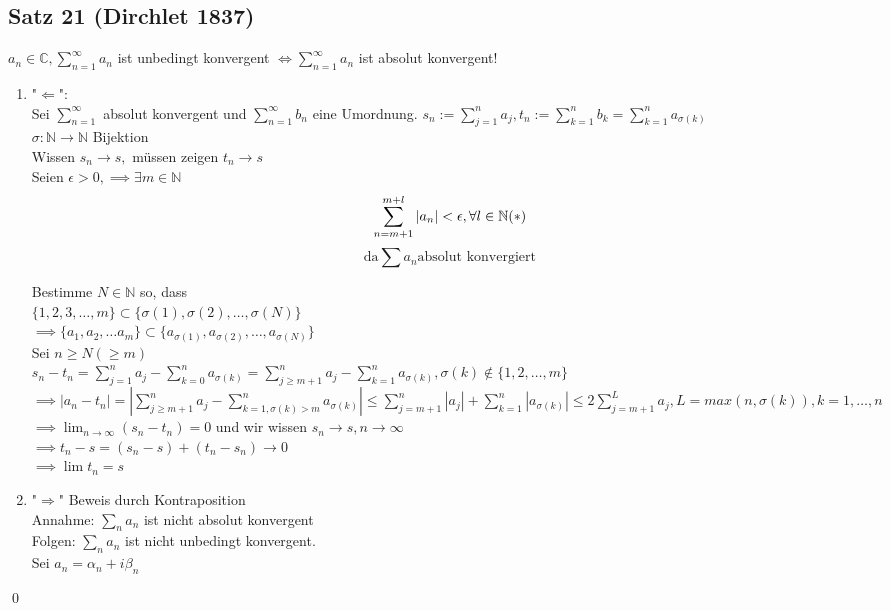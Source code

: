 \documentclass[fleqn]{scrbook}
\newcommand{\N}{\mathbb{N}}
\newcommand{\sumOI}{\sum_{n=1}^{\infty}}
\renewenvironment{proof}{{\bfseries Beweis }}{\qed}
\begin{document}
\subsection{Satz 21 (Dirchlet 1837)}
$a_n \in\mathbb{C}, \sumOI a_n$ ist unbedingt konvergent $\Leftrightarrow \sumOI a_n$ ist absolut konvergent!\\
\begin{proof}
\begin{enumerate}[1)]
  \item "$\Leftarrow$": \\
  Sei $\sumOI$ absolut konvergent und $\sumOI b_n$ eine Umordnung.
  $s_n := \sum_{j=1}^n a_j, t_n := \sum_{k=1}^n b_k = \sum_{k=1}^n a_{\sigma (k)}$\\
  $\sigma : \mathbb{N} \rightarrow \mathbb{N}$ Bijektion\\
  Wissen $s_n \rightarrow s,$ müssen zeigen $t_n \rightarrow s$\\
  Seien $\epsilon > 0, \implies \exists m \in \N$
  $$\sum_{n=m+1}^{m+l} |a_n| < \epsilon, \forall l \in\mathbb{N}\text{(\textasteriskcentered )}$$
  $$\text{da} \sum a_n \text{absolut konvergiert}$$

  Bestimme $N \in \mathbb{N}$ so, dass\\
  $\{ 1,2,3,\ldots,m\} \subset \{ \sigma (1), \sigma (2), \ldots, \sigma (N)\}$\\
  $\implies \{a_1, a_2, \ldots a_m\} \subset \{a_{\sigma (1)}, a_{\sigma(2)}, \ldots , a_{\sigma (N)}\}$\\
  Sei $n\geq N (\geq m)$\\
  $s_n - t_n = \sum_{j=1}^n a_j - \sum_{k=0}^n a_{\sigma (k)} = \sum_{j \geq m + 1}^n a_j - \sum_{k=1}^n a_{\sigma (k)}, \sigma (k) \notin \{1,2,\ldots ,m\}$\\
  $\implies |a_n - t_n| = |\sum_{j\geq m + 1}^n a_j - \sum_{k=1, \sigma(k) > m}^n a_{\sigma (k)}| \leq \sum_{j=m+1}^n |a_j| + \sum_{k=1}^n |a_{\sigma (k)}| \leq 2 \sum_{j=m+1}^L a_j, L = max(n, \sigma (k)), k=1,\ldots ,n$\\
  $\implies \lim_{n\rightarrow\infty} (s_n - t_n) = 0$ und wir wissen $s_n \rightarrow s, n \rightarrow\infty$\\
  $\implies t_n - s = (s_n - s) + (t_n - s_n) \rightarrow 0$\\
  $\implies \lim t_n = s$ \checkmark
  \item "$\Rightarrow$" Beweis durch Kontraposition\\
  Annahme: $\sum_n a_n$ ist nicht absolut konvergent\\
  Folgen: $\sum_n a_n$ ist nicht unbedingt konvergent.\\
  Sei $a_n = \alpha_n + i \beta_n$
\end{enumerate}
\end{proof}
\end{document}
